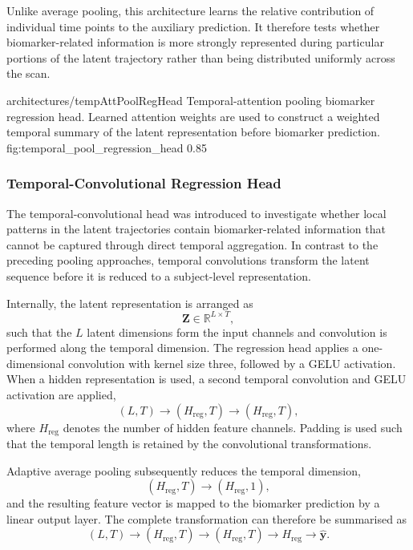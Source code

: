 Unlike average pooling, this architecture learns the relative contribution
of individual time points to the auxiliary prediction. It therefore tests
whether biomarker-related information is more strongly represented during
particular portions of the latent trajectory rather than being distributed
uniformly across the scan.

\thesisfigure
    {architectures/tempAttPoolRegHead}
    {Temporal-attention pooling biomarker regression head. Learned attention
    weights are used to construct a weighted temporal summary of the latent
    representation before biomarker prediction.}
    {fig:temporal_pool_regression_head}
    {0.85\textwidth}

\subsubsection{Temporal-Convolutional Regression Head}

The temporal-convolutional head was introduced to investigate whether local
patterns in the latent trajectories contain biomarker-related information
that cannot be captured through direct temporal aggregation. In contrast to
the preceding pooling approaches, temporal convolutions transform the
latent sequence before it is reduced to a subject-level representation.

Internally, the latent representation is arranged as
\[
    \mathbf{Z}\in\mathbb{R}^{L\times T},
\]
such that the $L$ latent dimensions form the input channels and convolution
is performed along the temporal dimension. The regression head applies a
one-dimensional convolution with kernel size three, followed by a GELU
activation. When a hidden representation is used, a second temporal
convolution and GELU activation are applied,
\[
    (L,T)
    \rightarrow
    (H_{\mathrm{reg}},T)
    \rightarrow
    (H_{\mathrm{reg}},T),
\]
where $H_{\mathrm{reg}}$ denotes the number of hidden feature channels.
Padding is used such that the temporal length is retained by the
convolutional transformations.

Adaptive average pooling subsequently reduces the temporal dimension,
\[
    (H_{\mathrm{reg}},T)
    \rightarrow
    (H_{\mathrm{reg}},1),
\]
and the resulting feature vector is mapped to the biomarker prediction by a
linear output layer. The complete transformation can therefore be
summarised as
\[
    (L,T)
    \rightarrow
    (H_{\mathrm{reg}},T)
    \rightarrow
    (H_{\mathrm{reg}},T)
    \rightarrow
    H_{\mathrm{reg}}
    \rightarrow
    \hat{\mathbf{y}}.
\]

